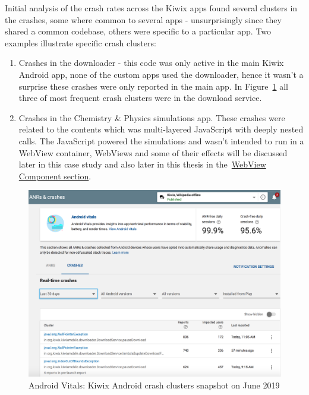 Initial analysis of the crash rates across the Kiwix apps found several clusters in the crashes, some where common to several apps - unsurprisingly since they shared a common codebase, others were specific to a particular app. Two examples illustrate specific crash clusters:
\begin{enumerate}
    \item Crashes in the downloader - this code was only active in the main Kiwix Android app, none of the custom apps used the downloader, hence it wasn't a surprise these crashes were only reported in the main app. In Figure~\ref{fig:android-vitals-kiwix-android-example-crash-clusters-10-jun-2019} all three of most frequent crash clusters were in the download service. 
    \item Crashes in the Chemistry \& Physics simulations app. These crashes were related to the contents which was multi-layered JavaScript with deeply nested calls. The JavaScript powered the simulations and wasn't intended to run in a WebView container, WebViews and some of their effects will be discussed later in this case study and also later in this thesis in the~\href{section-webview-component}{WebView Component section}.
\end{enumerate}

\begin{figure}
    \centering
    \includegraphics[width=13cm]{images/android-vitals-screenshots/Example-crash-clusters 10-jun-2019.png}
    \caption{Android Vitals: Kiwix Android crash clusters snapshot on  June 2019}
    \label{fig:android-vitals-kiwix-android-example-crash-clusters-10-jun-2019}
\end{figure}

